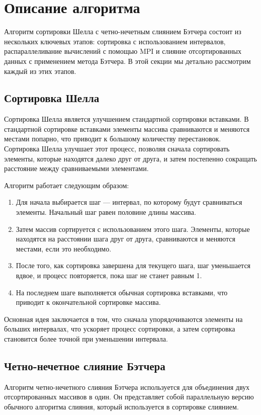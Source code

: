 \documentclass[a4paper,12pt]{article}
\begin{document}
\section{Описание алгоритма}

Алгоритм сортировки Шелла с четно-нечетным слиянием Бэтчера состоит из нескольких ключевых этапов: сортировка с использованием интервалов, распараллеливание вычислений с помощью MPI и слияние отсортированных данных с применением метода Бэтчера. В этой секции мы детально рассмотрим каждый из этих этапов.

\subsection{Сортировка Шелла}
Сортировка Шелла является улучшением стандартной сортировки вставками. В стандартной сортировке вставками элементы массива сравниваются и меняются местами попарно, что приводит к большому количеству перестановок. Сортировка Шелла улучшает этот процесс, позволяя сначала сортировать элементы, которые находятся далеко друг от друга, и затем постепенно сокращать расстояние между сравниваемыми элементами.

Алгоритм работает следующим образом:
\begin{enumerate}
    \item Для начала выбирается шаг — интервал, по которому будут сравниваться элементы. Начальный шаг равен половине длины массива.
    \item Затем массив сортируется с использованием этого шага. Элементы, которые находятся на расстоянии шага друг от друга, сравниваются и меняются местами, если это необходимо.
    \item После того, как сортировка завершена для текущего шага, шаг уменьшается вдвое, и процесс повторяется, пока шаг не станет равным 1.
    \item На последнем шаге выполняется обычная сортировка вставками, что приводит к окончательной сортировке массива.
\end{enumerate}

Основная идея заключается в том, что сначала упорядочиваются элементы на больших интервалах, что ускоряет процесс сортировки, а затем сортировка становится более точной при уменьшении интервала.

\subsection{Четно-нечетное слияние Бэтчера}
Алгоритм четно-нечетного слияния Бэтчера используется для объединения двух отсортированных массивов в один. Он представляет собой параллельную версию обычного алгоритма слияния, который используется в сортировке слиянием.
\end{document}

